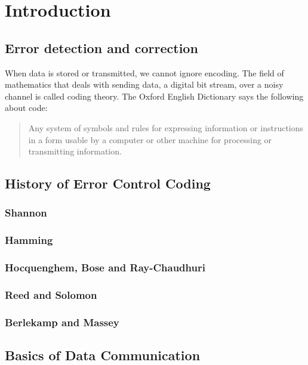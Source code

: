 \chapter{Introduction}

\section{Error detection and correction}

When data is stored or transmitted, we cannot ignore encoding. The field of mathematics that deals with sending data, a digital bit stream, over a noisy channel is called coding theory. The Oxford English Dictionary says the following about code:

\begin{quote}
    Any system of symbols and rules for expressing information or instructions in a form usable by a computer or other machine for processing or transmitting information.
\end{quote}

\section{History of Error Control Coding}
\subsection{Shannon}
\subsection{Hamming}
\subsection{Hocquenghem, Bose and Ray-Chaudhuri}
\subsection{Reed and Solomon}
\subsection{Berlekamp and Massey}

\section{Basics of Data Communication}
